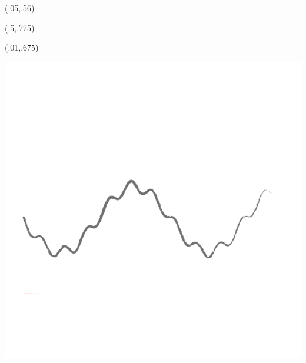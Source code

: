 \begin{textblock}{.9}(.05,.56)
	\begin{flushright}
		\noindent {\fontsize{20.74}{2}\selectfont
			\bfseries\textcolor{white}{Manualozzo di Analisi Matematica 3}}
	\end{flushright}
\end{textblock}


\begin{textblock}{.45}(.5,.775)
	\begin{center}
	\end{center}
\end{textblock}

\begin{textblock}{.4}(.01,.675)
	\begin{center}
		\includegraphics[width=.4\paperwidth]{images/frontpage1}
	\end{center}
\end{textblock}

